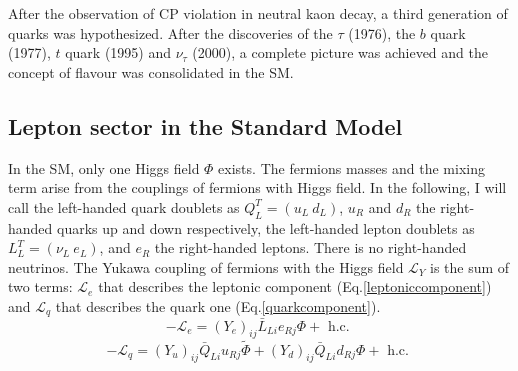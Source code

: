 After the observation of CP violation in neutral kaon 
decay, a third generation of quarks was hypothesized. After the discoveries of the $\tau$ (1976), 
the $b$ quark (1977), $t$ quark (1995) and $\nu_{\tau}$ (2000), a complete picture was achieved and the concept of flavour was consolidated in the SM.

\subsection{Lepton sector in the Standard Model}\label{leptonsector}
In the SM, only one Higgs field $\Phi$ exists. The 
fermions masses and the mixing term arise from the 
couplings of fermions with Higgs field. In the following, 
I will call the left-handed quark doublets 
as $Q^T_{L}=(u_{L} \ d_{L})$, $u_R$ and $d_R$ the 
right-handed quarks up and down respectively,  
the left-handed lepton doublets as 
$L^T_{L}=(\nu_{L} \ e_{L})$, and $e_R$ 
the right-handed leptons. There 
is no right-handed 
neutrinos. The Yukawa coupling of 
fermions with the Higgs 
field $\mathscr{L}_Y$ is the sum of 
two terms: $\mathscr{L}_e$ 
that describes the leptonic component 
(Eq.\ref{leptoniccomponent}) 
and $\mathscr{L}_q$ that describes the 
quark one (Eq.\ref{quarkcomponent}).
\begin{equation}\label{leptoniccomponent}
    -\mathscr{L}_e=\left(Y_e\right)_{i j} \bar{L}_{L i} e_{R j} \Phi+ \text{ h.c. }
\end{equation}
\begin{equation}\label{quarkcomponent}
        -\mathscr{L}_q=\left(Y_u\right)_{i j} \bar{Q}_{L i} u_{R j} \widetilde{\Phi}+\left(Y_d\right)_{i j} \bar{Q}_{L i} d_{R j} \Phi+\text { h.c. }
\end{equation}


